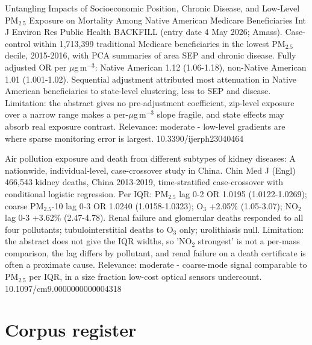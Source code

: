 \documentclass[10pt]{article}
\begin{document}
{Untangling Impacts of Socioeconomic Position, Chronic Disease, and Low-Level PM$_{2.5}$ Exposure on Mortality Among Native American Medicare Beneficiaries}
{Int J Environ Res Public Health}
{BACKFILL (entry date 4 May 2026; Amass). Case-control within 1,713,399 traditional Medicare beneficiaries in the lowest PM$_{2.5}$ decile, 2015-2016, with PCA summaries of area SEP and chronic disease. Fully adjusted OR per $\mu$g\,m$^{-3}$: Native American 1.12 (1.06-1.18), non-Native American 1.01 (1.001-1.02). Sequential adjustment attributed most attenuation in Native American beneficiaries to state-level clustering, less to SEP and disease. Limitation: the abstract gives no pre-adjustment coefficient, zip-level exposure over a narrow range makes a per-$\mu$g\,m$^{-3}$ slope fragile, and state effects may absorb real exposure contrast. Relevance: moderate - low-level gradients are where sparse monitoring error is largest.}
{10.3390/ijerph23040464}

\par{}\baselineskip{}\baselineskip
{}

{Air pollution exposure and death from different subtypes of kidney diseases: A nationwide, individual-level, case-crossover study in China.}
{Chin Med J (Engl)}
{466,543 kidney deaths, China 2013-2019, time-stratified case-crossover with conditional logistic regression. Per IQR: PM$_{2.5}$ lag 0-2 OR 1.0195 (1.0122-1.0269); coarse PM$_{2.5}$-10 lag 0-3 OR 1.0240 (1.0158-1.0323); O$_3$ +2.05\% (1.05-3.07); NO$_2$ lag 0-3 +3.62\% (2.47-4.78). Renal failure and glomerular deaths responded to all four pollutants; tubulointerstitial deaths to O$_3$ only; urolithiasis null. Limitation: the abstract does not give the IQR widths, so 'NO$_2$ strongest' is not a per-mass comparison, the lag differs by pollutant, and renal failure on a death certificate is often a proximate cause. Relevance: moderate - coarse-mode signal comparable to PM$_{2.5}$ per IQR, in a size fraction low-cost optical sensors undercount.}
{10.1097/cm9.0000000000004318}

\clearpage
\section*{\sffamily\bfseries\color{Deep}Corpus register}
\vspace{-1.5mm}{\color{Amber}\rule{\linewidth}{1.1pt}}\vspace{2.5mm}
\end{document}
